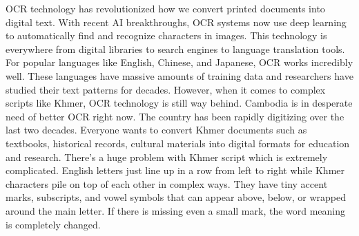 {\englishfont\fontsize{13.5pt}{17pt}\selectfont OCR technology has revolutionized how we convert printed 
documents into digital text. With recent AI breakthroughs, 
OCR systems now use deep learning to automatically find and 
recognize characters in images. This technology is everywhere from digital libraries to search engines to language translation tools.
For popular languages like English, Chinese, and Japanese, 
OCR works incredibly well. These languages have massive 
amounts of training data and researchers have studied 
their text patterns for decades. However, when it comes to 
complex scripts like Khmer, OCR technology is still way behind.
Cambodia is in desperate need of better OCR right now. 
The country has been rapidly digitizing over the last 
two decades. Everyone wants to convert Khmer documents such as
textbooks, historical records, cultural materials 
into digital formats for education and research.
There's a huge problem with Khmer script which is extremely complicated.
English letters just line up in 
a row from left to right while Khmer characters pile on top 
of each other in complex ways. They have tiny accent 
marks, subscripts, and vowel symbols that can appear 
above, below, or wrapped around the main letter. If 
there is missing even a small mark, the word meaning 
is completely changed.

\begin{table}[H]
    \centering
    \caption{Why Khmer OCR Is Desperately Needed}
    \vspace{6pt}
    \label{sec:textbook}
    \renewcommand{\arraystretch}{1.5} %
  \end{table}



}
